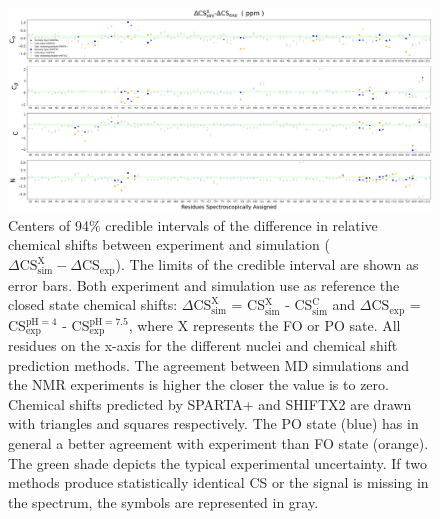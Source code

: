 \documentclass[%
 aip,
 amsmath,amssymb,
 preprint,%
]{revtex4-1}
\begin{document}
\begin{figure}
	\includegraphics[width=\textwidth]{figures_SI/assignment_skew_model_all_print.png}
	 \caption{\scriptsize
Centers of 94$\%$ credible intervals of the difference in relative chemical shifts between experiment and simulation ($\Delta\text{CS}_{\text{sim}}^{\text{X}}-\Delta\text{CS}_{\text{exp}}$). The limits of the credible interval are shown as error bars. Both experiment and simulation use as reference the closed state chemical shifts: $\Delta\text{CS}_{\text{sim}}^{\text{X}}$ = CS$_{\text{sim}}^{\text{X}}$ - CS$_{\text{sim}}^{\text{C}}$  and $\Delta\text{CS}_{\text{exp}}$ = CS$_{\text{exp}}^{\text{pH}=4}$ - CS$_{\text{exp}}^{\text{pH}=7.5}$, where X represents the FO or PO sate. All residues on the x-axis for the different nuclei and chemical shift prediction methods. The agreement between MD simulations and the NMR experiments is higher the closer the value is to zero. Chemical shifts predicted by SPARTA+ and SHIFTX2 are drawn with triangles and squares respectively. The PO state (blue) has in general a better agreement with experiment than FO state (orange). The green shade depicts the typical experimental uncertainty. If two methods produce statistically identical CS or the signal is missing in the spectrum, the symbols are represented in gray.}
\label{SI_assignment_all}
\end{figure}
\end{document}
